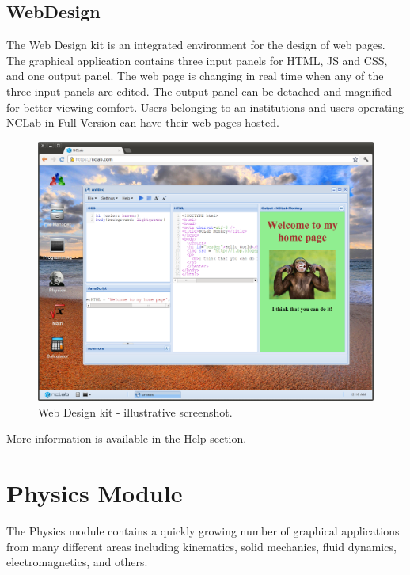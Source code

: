 \documentclass[article,A4,12pt]{llncs}
\begin{document}
\subsection{WebDesign}

The Web Design kit is an integrated environment for the design of web pages.
The graphical application contains three input panels for HTML, JS and CSS, and 
one output panel. The web page is changing in real time when any of the three 
input panels are edited. The output panel can be detached and magnified for better 
viewing comfort. Users belonging to an institutions and 
users operating NCLab in Full Version can have their web pages hosted.

\begin{figure}[!ht]
\begin{center}
\includegraphics[width=\textwidth]{img/progr6.png}
\end{center}
\caption{Web Design kit - illustrative screenshot.}
\label{fig:progr6}
\end{figure}
\noindent
More information is available in the Help section.

\section{Physics Module}

The Physics module contains a quickly growing number of graphical applications 
from many different areas including kinematics, solid mechanics, 
fluid dynamics, electromagnetics, and others.
\end{document}

